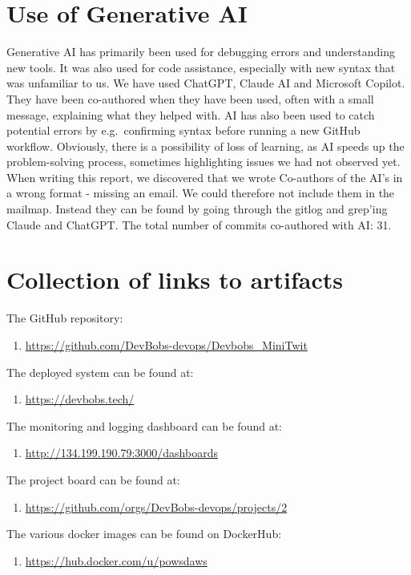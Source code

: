 \section{Use of Generative AI}\label{use-of-generative-ai}
Generative AI has primarily been used for debugging errors and understanding new tools.
It was also used for code assistance, especially with new syntax that was unfamiliar to us.
We have used ChatGPT, Claude AI and Microsoft Copilot.
They have been co-authored when they have been used, often with a small message, explaining what they helped with.
AI has also been used to catch potential errors by e.g.~confirming syntax before running a new GitHub workflow.
Obviously, there is a possibility of loss of learning, as
AI speeds up the problem-solving process, sometimes highlighting issues
we had not observed yet.
When writing this report, we discovered that we wrote Co-authors of the AI's in a wrong format - missing an email.
We could therefore not include them in the mailmap. 
Instead they can be found by going through the gitlog and grep'ing Claude and ChatGPT.
The total number of commits co-authored with AI: 31. 


\section{Collection of links to artifacts}

The GitHub repository:
\begin{enumerate}
    \item \url{https://github.com/DevBobs-devops/Devbobs_MiniTwit}
\end{enumerate}

The deployed system can be found at:
\begin{enumerate}
    \item \url{https://devbobs.tech/}
\end{enumerate}

The monitoring and logging dashboard can be found at:
\begin{enumerate}
    \item \url{http://134.199.190.79:3000/dashboards}
\end{enumerate}

The project board can be found at:
\begin{enumerate}
    \item \url{https://github.com/orgs/DevBobs-devops/projects/2}
\end{enumerate}

The various docker images can be found on DockerHub:
\begin{enumerate}
    \item \url{https://hub.docker.com/u/powsdaws}
\end{enumerate}